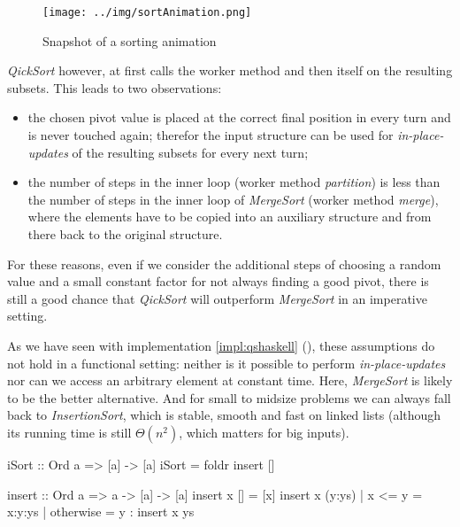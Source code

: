 \begin{figure}[ht]
\centering
\texttt{[image: ../img/sortAnimation.png]}
\caption[Sorting in Action]{Snapshot of a sorting animation}
\end{figure}

\emph{QickSort} however, at first calls the worker method and then itself on the resulting subsets.
This leads to two observations:
\begin{itemize}
    \item the chosen pivot value is placed at the correct final position in every turn and is never touched again; therefor the input structure can be used for \emph{in-place-updates} of the resulting subsets for every next turn;
    \item the number of steps in the inner loop (worker method \emph{partition}) is less than the number of steps in the inner loop of \emph{MergeSort} (worker method \emph{merge}), where the elements have to be copied into an auxiliary structure and from there back to the original structure.
\end{itemize}

For these reasons, even if we consider the additional steps of choosing a random value and a small constant factor for not always finding a good pivot, there is still a good chance that \emph{QickSort} will outperform \emph{MergeSort} in an imperative setting.

As we have seen with implementation \ref{impl:qshaskell} (), these assumptions do not hold in a functional setting: neither is it possible to perform \emph{in-place-updates} nor can we access an arbitrary element at constant time.
Here, \emph{MergeSort} is likely to be the better alternative. 
And for small to midsize problems we can always fall back to \emph{InsertionSort}, which is stable, smooth and fast on linked lists (although its running time is still $\Theta (n^2)$, which matters for big inputs).

\begin{impl}
\end{impl}

\begin{haskellcode}
iSort :: Ord a => [a] -> [a]
iSort = foldr insert []

insert :: Ord a => a -> [a] -> [a]
insert x [] = [x]
insert x (y:ys) | x <= y = x:y:ys
                | otherwise = y : insert x ys
\end{haskellcode}

